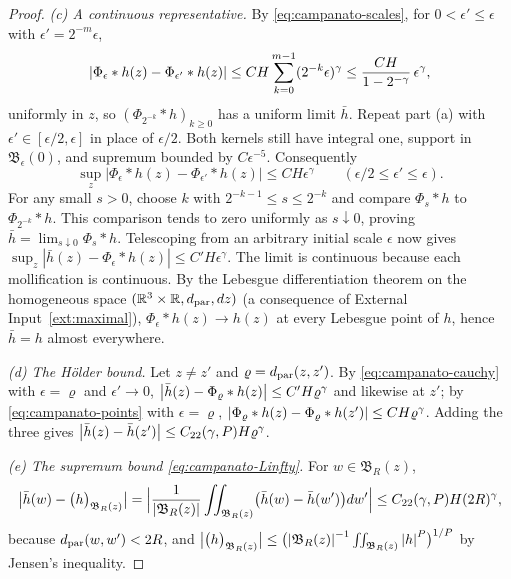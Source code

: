 \documentclass[11pt,reqno]{amsart}
\begin{document}
\begin{proof}
\emph{(c) A continuous representative.} By \eqref{eq:campanato-scales}, for
$0<\epsilon'\le\epsilon$ with $\epsilon'=2^{-m}\epsilon$,
\begin{equation}\label{eq:campanato-cauchy}
  \left\lvert \Phi_{\epsilon}*h(z)-\Phi_{\epsilon'}*h(z) \right\rvert
  \le CH\sum_{k=0}^{m-1}(2^{-k}\epsilon)^{\gamma}
  \le\frac{CH}{1-2^{-\gamma}}\,\epsilon^{\gamma},
\end{equation}
uniformly in $z$, so $(\Phi_{2^{-k}}*h)_{k\ge0}$ has a uniform limit
$\bar h$. Repeat part (a) with $\epsilon'\in[\epsilon/2,\epsilon]$
in place of $\epsilon/2$. Both kernels still have integral one,
support in $\mathfrak B_\epsilon(0)$, and supremum bounded by
$C\epsilon^{-5}$. Consequently
\[
 \sup_z|\Phi_\epsilon*h(z)-\Phi_{\epsilon'}*h(z)|
       \le CH\epsilon^\gamma
 \qquad(\epsilon/2\le\epsilon'\le\epsilon).
\]
For any small $s>0$, choose $k$ with $2^{-k-1}\le s\le2^{-k}$
and compare $\Phi_s*h$ to $\Phi_{2^{-k}}*h$. This comparison tends to
zero uniformly as $s\downarrow0$, proving
$\bar h=\lim_{s\downarrow0}\Phi_s*h$. Telescoping from an arbitrary
initial scale $\epsilon$ now gives
$\sup_z|\bar h(z)-\Phi_\epsilon*h(z)|\le C'H\epsilon^\gamma$.
The limit is continuous because each mollification is continuous.
By the Lebesgue differentiation theorem on the homogeneous space
$(\mathbb{R}^{3}\times\mathbb{R},d_{\mathrm{par}},dz)$ (a consequence of
External Input~\ref{ext:maximal}), $\Phi_{\epsilon}*h(z)\to h(z)$ at every
Lebesgue point of $h$, hence $\bar h=h$ almost everywhere.

\emph{(d) The H\"older bound.} Let $z\ne z'$ and $\varrho=d_{\mathrm{par}}(z,z')$. By
\eqref{eq:campanato-cauchy} with $\epsilon=\varrho$ and $\epsilon'\to0$,
$\left\lvert \bar h(z)-\Phi_{\varrho}*h(z) \right\rvert\le C'H\varrho^{\gamma}$ and likewise at
$z'$; by \eqref{eq:campanato-points} with $\epsilon=\varrho$,
$\left\lvert \Phi_{\varrho}*h(z)-\Phi_{\varrho}*h(z') \right\rvert\le CH\varrho^{\gamma}$. Adding
the three gives $\left\lvert \bar h(z)-\bar h(z') \right\rvert\le C_{22}(\gamma,P)H\varrho^{\gamma}$.

\emph{(e) The supremum bound \eqref{eq:campanato-Linfty}.} For
$w\in\mathfrak{B}_{R}(z)$,
\[
  \bigl|\bar h(w)-\bigl(h\bigr)_{\mathfrak{B}_{R}(z)}\bigr|
  =\Bigl|\frac1{\left\lvert \mathfrak{B}_{R}(z) \right\rvert}\iint_{\mathfrak{B}_{R}(z)}
     \bigl(\bar h(w)-\bar h(w')\bigr)dw'\Bigr|
  \le C_{22}(\gamma,P)H(2R)^{\gamma},
\]
because $d_{\mathrm{par}}(w,w')<2R$, and
$\bigl|\bigl(h\bigr)_{\mathfrak{B}_{R}(z)}\bigr|
 \le\bigl(\left\lvert \mathfrak{B}_{R}(z) \right\rvert^{-1}\iint_{\mathfrak{B}_{R}(z)}\left\lvert h \right\rvert^{P}\bigr)^{1/P}$
by Jensen's inequality.
\end{proof}
\end{document}
